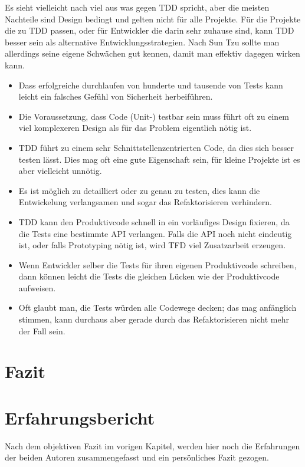 \documentclass[a4paper,10pt]{scrartcl}
\newcommand{\pje}{\marginpar{Philipp\\Jeske}}
\begin{document}
Es sieht vielleicht nach viel aus was gegen TDD spricht, aber die meisten
Nachteile sind Design bedingt und gelten nicht für alle Projekte. Für die
Projekte die zu TDD passen, oder für Entwickler die darin sehr zuhause sind,
kann TDD besser sein als alternative Entwicklungsstrategien. Nach Sun Tzu
sollte man allerdings seine eigene Schwächen gut kennen, damit man effektiv
dagegen wirken kann.

\begin{itemize}
    \item Dass erfolgreiche durchlaufen von hunderte und tausende von Tests
        kann leicht ein falsches Gefühl von Sicherheit herbeiführen.
        \cite{StackExchange}
    \item Die Voraussetzung, dass Code (Unit-) testbar sein muss führt oft zu
        einem viel komplexeren Design als für das Problem eigentlich nötig ist.
        \cite{StackExchange}
    \item TDD führt zu einem sehr Schnittstellenzentrierten Code, da dies sich
        besser testen lässt. Dies mag oft eine gute Eigenschaft sein, für
        kleine Projekte ist es aber vielleicht unnötig.
    \item Es ist möglich zu detailliert oder zu genau zu testen, dies kann die
        Entwickelung verlangsamen und sogar das Refaktorisieren verhindern.
    \item TDD kann den Produktivcode schnell in ein vorläufiges Design fixieren,
        da die Tests eine bestimmte API verlangen. Falls die API noch nicht
        eindeutig ist, oder falls Prototyping nötig ist, wird TFD viel
        Zusatzarbeit erzeugen. \cite{StackOverflow}
    \item Wenn Entwickler selber die Tests für ihren eigenen Produktivcode
        schreiben, dann können leicht die Tests die gleichen Lücken wie der
        Produktivcode aufweisen.
    \item Oft glaubt man, die Tests würden alle Codewege decken; das mag
        anfänglich stimmen, kann durchaus aber gerade durch das Refaktorisieren
        nicht mehr der Fall sein.
\end{itemize}

\section{Fazit}\label{Fazit}\pje

\section{Erfahrungsbericht}\label{Erfahrungsbericht}
Nach dem objektiven Fazit im vorigen Kapitel, werden hier noch die Erfahrungen
der beiden Autoren zusammengefasst und ein persönliches Fazit gezogen.
\end{document}
